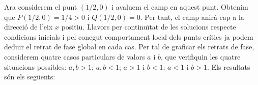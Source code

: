 \documentclass{article}
\begin{document}
Ara considerem el punt $(1/2,0)$ i avaluem el camp en aquest punt. Obtenim que $P(1/2,0)=1/4>0$ i $Q(1/2,0)=0$. Per tant, el camp anirà cap a la direcció de l'eix $x$ positiu. Llavors per continuïtat de les solucions respecte condicions inicials i pel conegut comportament local dels punts crítics ja podem deduir el retrat de fase global en cada cas. Per tal de graficar els retrats de fase, considerem quatre casos particulars de valors $a$ i $b$, que verifiquin les quatre situacions possibles: $a, b>1$; $a,b<1$; $a>1$ i $b<1$; $a<1$ i $b>1$. Els resultats són els següents:
\begin{comment}
\begin{center}
  \begin{tikzpicture}[scale=2.4]
    \draw (0,0)-- (0,3) node[above]{\tiny{$x=0$}};
    \draw (0,0)--(3,0) node[below]{\tiny{$y=0$}};
    \node at (0,0) {\textbullet};
    \node[below right] at (0,0){\tiny{$(0,0)$}};
    \node at (1,0) {\textbullet};
    \node[below right] at (1,0){\tiny{$(1,0)$}};
    \node at (0,1) {\textbullet};
    \node[below right] at (0,1){\tiny{$(0,1)$}};
    \node at (0.5,0.25) {\textbullet};
    \node[below right] at (2,1.5){\tiny{$(a=2,b=1.5)$}};
    
    \draw[very thick, color=black, decorated arrowsb] (0, 0)--(1,0);
    \draw[very thick, color=black, decorated arrowsb] (3, 0)--(1,0);
    \draw[very thick, color=black, decorated arrowsb] (0, 0)--(0,1);
    \draw[very thick, color=black, decorated arrowsb] (0, 3)--(0,1);
    \draw[very thick, color=black, decorated arrowsb] (0, 0)--(0.5, 0.25);
    \draw[very thick, color=black, decorated arrowsb] (3, 3/2)--(0.5,1/4);
    \draw[very thick, color=black, decorated arrowsb] (0, 0)--(0.5, 3/8);
    
  \end{tikzpicture}
\end{center}

Per $a=2>1, b=0.5<1$:
\begin{center}
  \begin{tikzpicture}[scale=2.4]
    \draw (0,0)-- (0,3) node[above]{\tiny{$x=0$}};
    \draw (0,0)--(3,0) node[below]{\tiny{$y=0$}};
    \node at (0,0) {\textbullet};
    \node[below right] at (0,0){\tiny{$(0,0)$}};
    \node at (1,0) {\textbullet};
    \node[below right] at (1,0){\tiny{$(1,0)$}};
    \node at (0,1) {\textbullet};
    \node[below right] at (0,1){\tiny{$(0,1)$}};
    
    \draw[very thick, color=black, decorated arrowsb] (0, 0)--(1,0);
    \draw[very thick, color=black, decorated arrowsb] (3, 0)--(1,0);
    \draw[very thick, color=black, decorated arrowsb] (0, 0)--(0,1);
    \draw[very thick, color=black, decorated arrowsb] (0, 3)--(0,1);
    \draw[very thick, color=black, decorated arrowsb] (0, 0)--(0.5, 0.25);
    
    
  \end{tikzpicture}
\end{center}
\end{comment}
\end{document}
